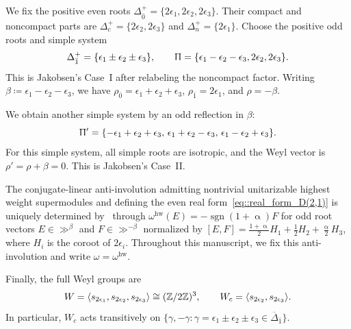 We fix the positive even roots $\Delta_{\bar0}^+=\{2\epsilon_1,2\epsilon_2,2\epsilon_3\}$. Their compact and noncompact parts are $\Delta_c^+=\{2\epsilon_2,2\epsilon_3\}$ and $\Delta_n^+=\{2\epsilon_1\}$. Choose the positive odd roots and simple system
\begin{equation}
\Delta_{\bar1}^+
=
\{\epsilon_1\pm\epsilon_2\pm\epsilon_3\},
\qquad
\Uppi
=
\{\epsilon_1-\epsilon_2-\epsilon_3,2\epsilon_2,2\epsilon_3\}.
\label{eq::D21alpha_positive_system}
\end{equation}
This is Jakobsen's Case~I after relabeling the noncompact factor. Writing $\beta\coloneqq\epsilon_1-\epsilon_2-\epsilon_3$, we have $\rho_{\bar0}=\epsilon_1+\epsilon_2+\epsilon_3$, $\rho_{\bar1}=2\epsilon_1$, and $\rho=-\beta$.

We obtain another simple system by an odd reflection in $\beta$:
\begin{equation}
\Uppi'
=
\{-\epsilon_1+\epsilon_2+\epsilon_3,\,
\epsilon_1+\epsilon_2-\epsilon_3,\,
\epsilon_1-\epsilon_2+\epsilon_3\}.
\label{eq::D21alpha_odd_reflection}
\end{equation}
For this simple system, all simple roots are isotropic, and the Weyl vector is $\rho'=\rho+\beta=0$. This is Jakobsen's Case~II.


The conjugate-linear anti-involution admitting nontrivial unitarizable highest weight supermodules and defining the even real form~\eqref{eq::real_form_D(2,1)} is uniquely determined by~\cite{jakobsen1994full} through $\omega^{\mathrm{hw}}(E)=-\operatorname{sgn}(1+\upalpha)F$ for odd root vectors $E\in\gg^\beta$ and $F\in\gg^{-\beta}$ normalized by $[E,F]=\tfrac{1+\upalpha}{2}H_1+\tfrac12H_2+\tfrac{\upalpha}{2}H_3$, where $H_i$ is the coroot of $2\epsilon_i$. Throughout this manuscript, we fix this anti-involution and write $\omega=\omega^{\mathrm{hw}}$.


Finally, the full Weyl groups are
\begin{equation}
W
=
\langle s_{2\epsilon_1},s_{2\epsilon_2},s_{2\epsilon_3}\rangle
\cong({\mathbb Z}/2{\mathbb Z})^3,
\qquad
W_c
=
\langle s_{2\epsilon_2},s_{2\epsilon_3}\rangle.
\end{equation}
In particular, $W_c$ acts transitively on $\{\gamma,-\gamma : \gamma=\epsilon_1\pm\epsilon_2\pm\epsilon_3 \in \overline{\Delta}_{\bar{1}}\}$.